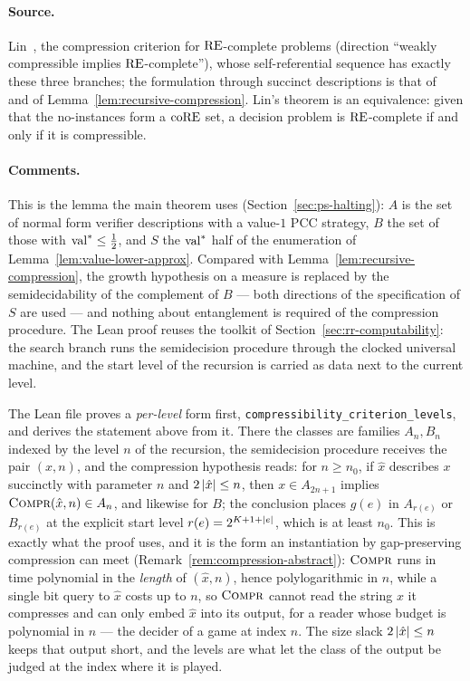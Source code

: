 \paragraph{Source.} Lin~\cite{Lin25}, the compression criterion for $\mathrm{RE}$-complete
problems (direction ``weakly compressible implies $\mathrm{RE}$-complete''), whose
self-referential sequence has exactly these three branches; the formulation through
succinct descriptions is that of~\cite{MNY} and of Lemma~\ref{lem:recursive-compression}.
Lin's theorem is an equivalence: given that the no-instances form a $\mathrm{coRE}$ set, a
decision problem is $\mathrm{RE}$-complete if and only if it is compressible.

\paragraph{Comments.} This is the lemma the main theorem uses
(Section~\ref{sec:ps-halting}): $A$ is the set of normal form verifier descriptions with a
value-$1$ PCC strategy, $B$ the set of those with $\mathrm{val}^* \leq \frac12$, and $S$ the
$\mathrm{val}^*$ half of the enumeration of Lemma~\ref{lem:value-lower-approx}. Compared with
Lemma~\ref{lem:recursive-compression}, the growth hypothesis on a measure is replaced by
the semidecidability of the complement of $B$ --- both directions of the specification of
$S$ are used --- and nothing about entanglement is required of the compression procedure.
The Lean proof reuses the toolkit of Section~\ref{sec:rr-computability}: the search
branch runs the semidecision procedure through the clocked universal machine, and the
start level of the recursion is carried as data next to the current level.

The Lean file proves a \emph{per-level} form first,
\texttt{compressibility\_criterion\_levels}, and derives the statement above from it. There
the classes are families $A_n, B_n$ indexed by the level $n$ of the recursion, the
semidecision procedure receives the pair $(x, n)$, and the compression hypothesis reads: for
$n \geq n_0$, if $\hat x$ describes $x$ succinctly with parameter $n$ and $2\left\vert {\hat x} \right\vert
\leq n$, then $x \in A_{2n+1}$ implies $\textsc{Compr}(\hat x, n) \in A_n$, and likewise for $B$;
the conclusion places $g(e)$ in $A_{r(e)}$ or $B_{r(e)}$ at the explicit start level $r(e)
= 2^{K + 1 + \left\vert {e} \right\vert}$, which is at least $n_0$. This is exactly what the proof uses, and
it is the form an instantiation by gap-preserving compression can meet
(Remark~\ref{rem:compression-abstract}): $\textsc{Compr}$ runs in time polynomial in the
\emph{length} of $(\hat x, n)$, hence polylogarithmic in $n$, while a single bit query to
$\hat x$ costs up to $n$, so $\textsc{Compr}$ cannot read the string $x$ it compresses and can only
embed $\hat x$ into its output, for a reader whose budget is polynomial in $n$ --- the
decider of a game at index $n$. The size slack $2\left\vert {\hat x} \right\vert \leq n$ keeps that output
short, and the levels are what let the class of the output be judged at the index where
it is played.

